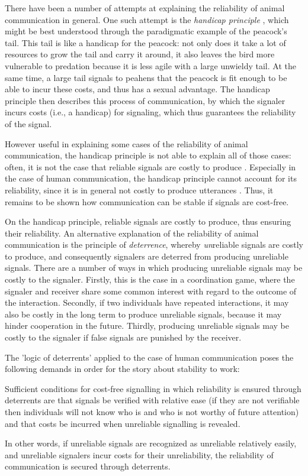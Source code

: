 There have been a number of attempts at explaining the reliability of animal communication in general. One such attempt is the \emph{handicap principle} \citep{Zahavi75, Zahavi99}, which might be best understood through the paradigmatic example of the peacock's tail.
This tail is like a handicap for the peacock: not only does it take a lot of resources to grow the tail and carry it around, it also leaves the bird more vulnerable to predation because it is less agile with a large unwieldy tail. At the same time, a large tail signals to peahens that the peacock is fit enough to be able to incur these costs, and thus has a sexual advantage.
The handicap principle then describes this process of communication, by which the signaler incurs costs (i.e., a handicap) for signaling, which thus guarantees the reliability of the signal.

However useful in explaining some cases of the reliability of animal communication, the handicap principle is not able to explain all of those cases: often, it is not the case that reliable signals are costly to produce \citep{Scott-Phillips08} . Especially in the case of human communication, the handicap principle cannot account for its reliability, since it is in general not costly to produce utterances \citep{Scott-Phillips08}.
Thus, it remains to be shown how communication can be stable if signals are cost-free.

On the handicap principle, reliable signals are costly to produce, thus ensuring their reliability. An alternative explanation of the reliability of animal communication is the principle of \emph{deterrence}, whereby \emph{un}reliable signals are costly to produce, and consequently signalers are deterred from producing unreliable signals.
There are a number of ways in which producing unreliable signals may be costly to the signaler. Firstly, this is the case in a coordination game, where the signaler and receiver share some common interest with regard to the outcome of the interaction.
Secondly, if two individuals have repeated interactions, it may also be costly in the long term to produce unreliable signals, because it may hinder cooperation in the future.
Thirdly, producing unreliable signals may be costly to the signaler if false signals are punished by the receiver.

The 'logic of deterrents' applied to the case of human communication poses the following demands in order for the story about stability to work:
\begin{quoting}
    Sufficient conditions for cost-free signalling in which reliability is ensured through deterrents are that signals be verified with relative ease (if they are not verifiable then individuals will not know who is and who is not worthy of future attention) and that costs be incurred when unreliable signalling is revealed.
    \hfill \citep[p.~279]{Scott-Phillips08}
\end{quoting}
In other words, if unreliable signals are recognized as unreliable relatively easily, and unreliable signalers incur costs for their unreliability, the reliability of communication is secured through deterrents.

